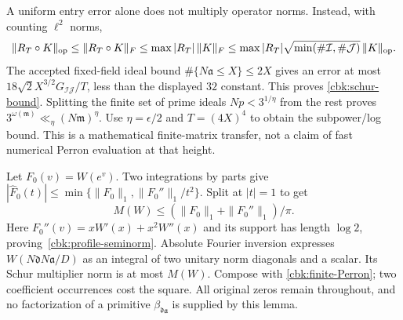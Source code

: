 A uniform entry error alone does not multiply operator norms.
Instead, with counting $\ell^2$ norms,
\[
 \|R_T\circ K\|_{\rm op}
  \le\|R_T\circ K\|_F
  \le\max|R_T|\,\|K\|_F
  \le\max|R_T|\sqrt{\min(\#\mathcal I,\#\mathcal J)}\,\|K\|_{\rm op}.
\]
The accepted fixed-field ideal bound $\#\{N\mathfrak a\le X\}\le2X$
gives an error at most $18\sqrt2X^{3/2}G_{\mathcal I\mathcal J}/T$,
less than the displayed $32$ constant. This proves
\eqref{cbk:schur-bound}. Splitting the finite set of prime ideals
$Np<3^{1/\eta}$ from the rest proves
$3^{\omega(\mathfrak m)}\ll_\eta(N\mathfrak m)^\eta$.
Use $\eta=\epsilon/2$ and $T=(4X)^4$ to obtain the subpower/log bound.
This is a mathematical finite-matrix transfer, not a claim of
fast numerical Perron evaluation at that height.

Let $F_0(v)=W(e^v)$. Two integrations by parts give
$|\widehat F_0(t)|\le\min\{\|F_0\|_1,\|F_0''\|_1/t^2\}$.
Split at $|t|=1$ to get
\[
 M(W)\le(\|F_0\|_1+\|F_0''\|_1)/\pi.
\]
Here $F_0''(v)=xW'(x)+x^2W''(x)$ and its support has length
$\log2$, proving~\eqref{cbk:profile-seminorm}.
Absolute Fourier inversion expresses $W(N\mathfrak dN\mathfrak a/D)$
as an integral of two unitary norm diagonals and a scalar. Its
Schur multiplier norm is at most $M(W)$. Compose with
\eqref{cbk:finite-Perron}; two coefficient occurrences cost the
square. All original zeros remain throughout, and no factorization
of a primitive $\beta_{\mathfrak d\mathfrak a}$ is supplied by this lemma.

